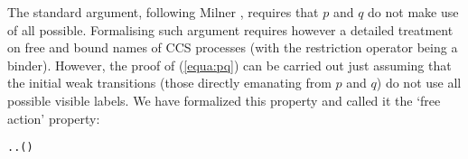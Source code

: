 The standard argument, following Milner \cite{Milner_ccs_book}, requires that $p$
and $q$ do not make use of all possible. 
Formalising such argument requires however 
a detailed
treatment on free and bound names  of CCS
processes (with the restriction operator being a binder).
However, the proof of (\ref{equa:pq}) can be carried out 
just assuming that the 
initial weak transitions (those directly emanating from 
 $p$ and $q$) do not use all possible visible labels.
We
have formalized this property and
 called it the `free action' property:
\begin{alltt}
\HOLTokenTurnstile{}   \HOLSymConst{\HOLTokenEquiv{}} \HOLSymConst{\HOLTokenExists{}}. \HOLSymConst{\HOLTokenForall{}}. \HOLSymConst{\HOLTokenNeg{}}( \HOLTokenWeakTransBegin{} \HOLTokenWeakTransEnd {})
\end{alltt}
